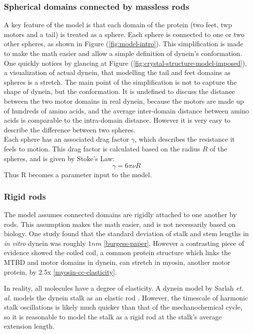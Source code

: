 \documentclass[10pt]{article} %
\begin{document}
\subsubsection{Spherical domains connected by massless rods}
A key feature of the model is that each domain of the protein (two feet, twp motors and a tail) is treated as a sphere. Each sphere is connected to one or two other spheres, as shown in Figure (\ref{fig:model-intro}). This simplification is made to make the math easier and allow a simple definition of dynein's conformation.\\

One quickly notices by glancing at Figure (\ref{fig:crystal-structure-model-imposed}), a visualization of actual dynein, that modelling the tail and feet domains as spheres is a stretch. The main point of the simplification is not to capture the shape of dynein, but the conformation. It is undefined to discuss the distance between the two motor domains in real dynein, because the motors are made up of hundreds of amino acids, and the average inter-domain distance between amino acids is comparable to the intra-domain distance. However it is very easy to describe the difference between two spheres.\\

Each sphere has an associated drag factor $\gamma$, which describes the resistance it feels to motion. This drag factor is calculated based on the radius $R$ of the spheres, and is given by Stoke's Law:
%
\begin{equation}
  \gamma = 6\pi\nu R
\end{equation}
%
Thus R becomes a parameter input to the model.\\

\subsubsection{Rigid rods}
The model assumes connected domains are rigidly attached to one another by rods. This assumption makes the math easier, and is not necessarily based on biology. One study found that the standard deviation of stalk and stem lengths in \textit{in vitro} dynein was roughly $1nm$ \ref{burgess-paper}. However a contrasting piece of evidence showed the coiled coil, a common protein structure which links the MTBD and motor domains in dynein, can stretch in myosin, another motor protein, by 2.5x \ref{myosin-cc-elasticity}.

In reality, all molecules have a degree of elasticity. A dynein model by Sarlah \textit{et. al.} models the dynein stalk as an elastic rod \cite{sarlahmodel}. However, the timescale of harmonic stalk oscillations is likely much quicker than that of the mechanochemical cycle, so it is reasonable to model the stalk as a rigid rod at the stalk's average extension length.\\
\end{document}
